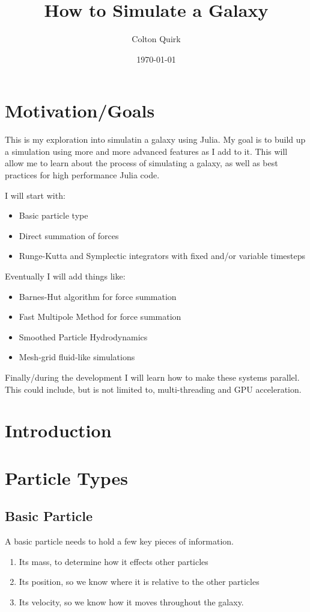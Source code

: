 \documentclass[11pt]{article}
\author{Colton Quirk}
\date{\today}
\title{How to Simulate a Galaxy}
\begin{document}
\maketitle
\tableofcontents

\section{Motivation/Goals}
\label{sec:orgdd6d50a}
This is my exploration into simulatin a galaxy using Julia.
My goal is to build up a simulation using more and more advanced features as I add to it.
This will allow me to learn about the process of simulating a galaxy, as well as best practices for high performance Julia code.

I will start with:
\begin{itemize}
\item Basic particle type
\item Direct summation of forces
\item Runge-Kutta and Symplectic integrators with fixed and/or variable timesteps
\end{itemize}

Eventually I will add things like:
\begin{itemize}
\item Barnes-Hut algorithm for force summation
\item Fast Multipole Method for force summation
\item Smoothed Particle Hydrodynamics
\item Mesh-grid fluid-like simulations
\end{itemize}

Finally/during the development I will learn how to make these systems parallel.
This could include, but is not limited to, multi-threading and GPU acceleration.
\section{Introduction}
\label{sec:orgcd67094}

\section{Particle Types}
\label{sec:org7877b8c}
\subsection{Basic Particle}
\label{sec:org4f3a702}
A basic particle needs to hold a few key pieces of information.
\begin{enumerate}
\item Its mass, to determine how it effects other particles
\item Its position, so we know where it is relative to the other particles
\item Its velocity, so we know how it moves throughout the galaxy.
\end{enumerate}
\end{document}
